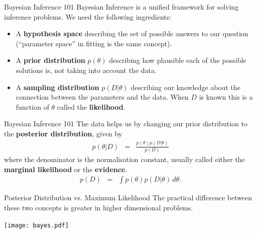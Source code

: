 \begin{frame}[t]{Bayesian Inference 101}
Bayesian Inference is a unified framework for solving inference problems.
We need the following ingredients:

\begin{itemize}
\setlength{\itemsep}{20pt}
\item A {\bf hypothesis space} describing the set of possible answers to our
question (``parameter space'' in fitting is the same concept).
\item A {\bf prior distribution} $p(\theta)$ describing how plausible
each of the possible solutions is, not taking into account the data.
\item A {\bf sampling distribution} $p(D | \theta)$ describing our knowledge
about the connection between the parameters and the data. When $D$ is known
this is a function of $\theta$ called the {\bf likelihood}.
\end{itemize}

\end{frame}


\begin{frame}[t]{Bayesian Inference 101}
The data helps us by changing our prior distribution to the {\bf posterior
distribution}, given by
\begin{eqnarray}
p(\theta | D) &=& \frac{p(\theta) p(D|\theta)}{p(D)}
\end{eqnarray}
where the denominator is the normalisation constant, usually called either
the {\bf marginal likelihood} or the {\bf evidence}.
\begin{eqnarray}
p(D) &=& \int p(\theta)p(D|\theta) \, d\theta.
\end{eqnarray}

\end{frame}

\begin{frame}[t]{Posterior Distribution vs. Maximum Likelihood}
The practical difference between these two concepts is greater in higher
dimensional problems.
\begin{center}
\texttt{[image: bayes.pdf]}
\end{center}
\end{frame}



